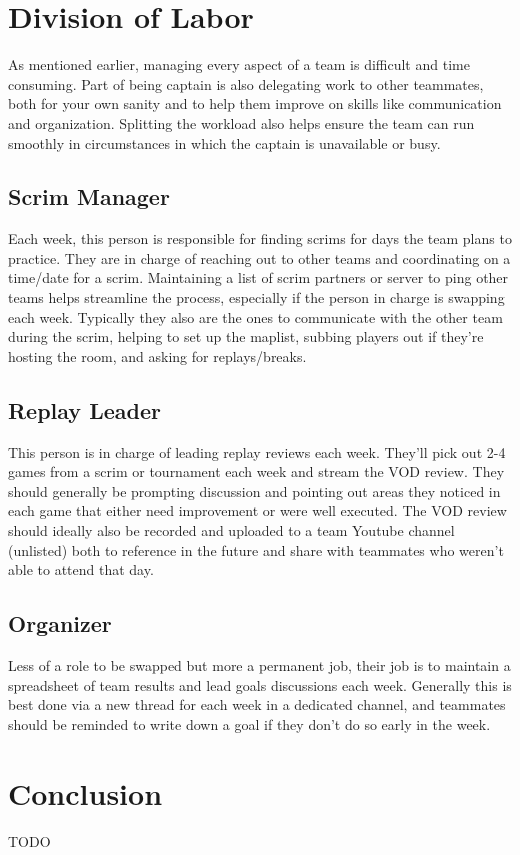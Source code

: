 \documentclass[12pt]{article}
\begin{document}
\section{Division of Labor}
As mentioned earlier, managing every aspect of a team is difficult and time consuming. Part of being captain is also delegating work to other teammates, both for your own sanity and to help them improve on skills like communication and organization. Splitting the workload also helps ensure the team can run smoothly in circumstances in which the captain is unavailable or busy. 
\subsection{Scrim Manager}
Each week, this person is responsible for finding scrims for days the team plans to practice. They are in charge of reaching out to other teams and coordinating on a time/date for a scrim. Maintaining a list of scrim partners or server to ping other teams helps streamline the process, especially if the person in charge is swapping each week. Typically they also are the ones to communicate with the other team during the scrim, helping to set up the maplist, subbing players out if they're hosting the room, and asking for replays/breaks.
\subsection{Replay Leader}
This person is in charge of leading replay reviews each week. They'll pick out 2-4 games from a scrim or tournament each week and stream the VOD review. They should generally be prompting discussion and pointing out areas they noticed in each game that either need improvement or were well executed. The VOD review should ideally also be recorded and uploaded to a team Youtube channel (unlisted) both to reference in the future and share with teammates who weren't able to attend that day.
\subsection{Organizer}
Less of a role to be swapped but more a permanent job, their job is to maintain a spreadsheet of team results and lead goals discussions each week. Generally this is best done via a new thread for each week in a dedicated channel, and teammates should be reminded to write down a goal if they don't do so early in the week. 



\section{Conclusion}
TODO
\end{document}
